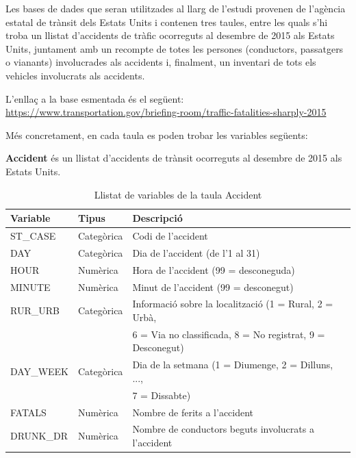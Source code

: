 \documentclass[12pt,longbibliography]{article}
\theoremstyle{definition}
\theoremstyle{remark}
\begin{document}
Les bases de dades que seran utilitzades al llarg de l'estudi provenen de l'agència estatal de trànsit dels Estats Units i contenen tres taules, entre les quals s'hi troba un llistat d’accidents de tràfic ocorreguts al desembre de 2015 als Estats Units, juntament amb un recompte de totes les persones (conductors, passatgers o vianants) involucrades als accidents i, finalment, un inventari de tots els vehicles involucrats als accidents. 


L'enllaç a la base esmentada és el següent:  \url{https://www.transportation.gov/briefing-room/traffic-fatalities-sharply-2015}


Més concretament, en cada taula es poden trobar les variables següents:


\textbf{Accident} és un llistat d’accidents de trànsit ocorreguts al desembre de 2015 als Estats Units.

\begin{table}[H]
\centering
\begin{tabular}{|l|l|l|}
\hline
\textbf{Variable} & \textbf{Tipus} & \textbf{Descripció}                                  \\\hline
ST\_CASE          & Categòrica     & Codi de l’accident                                   \\
DAY               & Categòrica     & Dia de l’accident (de l’1 al 31)                     \\
HOUR              & Numèrica       & Hora de l’accident (99 = desconeguda)                \\
MINUTE            & Numèrica       & Minut de l’accident (99 = desconegut)                \\
RUR\_URB  & Categòrica & Informació sobre la localització (1 = Rural, 2 = Urbà,  \\
   &   & 6 = Via no classificada, 8 = No registrat, 9 = Desconegut) \\
DAY\_WEEK & Categòrica & Dia de la setmana (1 = Diumenge, 2 = Dilluns, ...,                                              \\
  &   &  7 = Dissabte)                                                  \\
FATALS            & Numèrica       & Nombre de ferits a l’accident                        \\
DRUNK\_DR          & Numèrica       & Nombre de conductors beguts involucrats a l’accident \\\hline
\end{tabular}
\caption{\label{accident-table}Llistat de variables de la taula Accident}
\end{table}
\end{document}
